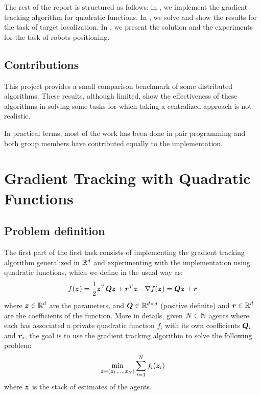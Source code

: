 \documentclass[a4paper,11pt,oneside]{book}
\begin{document}
The rest of the report is structured as follows: in , we implement the gradient tracking algorithm for quadratic functions. In , we solve and show the results for the task of target localization. In , we present the solution and the experiments for the task of robots positioning.


\section*{Contributions}

This project provides a small comparison benchmark of some distributed algorithms. These results, although limited, show the effectiveness of these algorithms in solving some tasks for which taking a centralized approach is not realistic. 

In practical terms, most of the work has been done in pair programming and both group members have contributed equally to the implementation.




\setcounter{page}{1}
\chapter{Gradient Tracking with Quadratic Functions} \label{ch:quadratic}



\section{Problem definition}

The first part of the first task consists of implementing the gradient tracking algorithm generalized in ${\mathbb{R}}^d$ and experimenting with the implementation using quadratic functions, which we define in the usual way as:
\[
      f({\bm{z}}) = \frac{1}{2} {\bm{z}}^T {\bm{Q}} {\bm{z}} + {\bm{r}}^T {\bm{z}}
      \quad
      \nabla f({\bm{z}}) = {\bm{Q}} {\bm{z}} + {\bm{r}}
\]
where ${\bm{z}} \in {\mathbb{R}}^{d}$ are the parameters, and ${\bm{Q}} \in {\mathbb{R}}^{d \times d}$ (positive definite) and ${\bm{r}} \in {\mathbb{R}}^{d}$ are the coefficients of the function. More in details, given $N \in {\mathbb{N}}$ agents where each has associated a private quadratic function $f_i$ with its own coefficients ${\bm{Q}}_i$ and ${\bm{r}}_i$, the goal is to use the gradient tracking algorithm to solve the following problem:
\[
      \min_{{\bm{z}}=({\bm{z}}_1, \dots, {\bm{z}}_N)} \sum_{i=1}^{N} f_i({\bm{z}}_i)
\]
where ${\bm{z}}$ is the stack of estimates of the agents.
\end{document}
